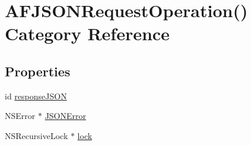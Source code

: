 \hypertarget{category_a_f_j_s_o_n_request_operation_07_08}{\section{A\-F\-J\-S\-O\-N\-Request\-Operation() Category Reference}
\label{category_a_f_j_s_o_n_request_operation_07_08}
}
\subsection*{Properties}
\begin{DoxyCompactItemize}
\item 
id \hyperlink{category_a_f_j_s_o_n_request_operation_07_08_a52b32f8f6a89688aed17411fe546b2ae}{response\-J\-S\-O\-N}
\item 
N\-S\-Error $\ast$ \hyperlink{category_a_f_j_s_o_n_request_operation_07_08_af84fedbcee459bee0491e551f017e9bd}{J\-S\-O\-N\-Error}
\item 
N\-S\-Recursive\-Lock $\ast$ \hyperlink{category_a_f_j_s_o_n_request_operation_07_08_a9b544e1fd2dc7ec2d568ec09c12ec9ed}{lock}
\end{DoxyCompactItemize}


